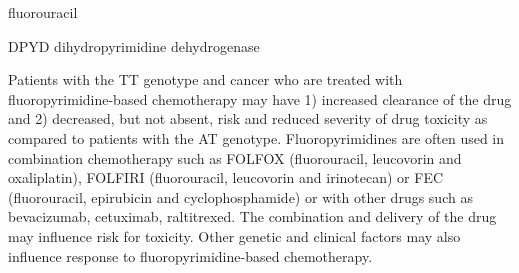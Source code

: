 \documentclass{resume} %
\begin{document}
\begin{rSection}{ fluorouracil }
\begin{rSubsection}{ DPYD }{ dihydropyrimidine dehydrogenase }{}{}
\item[] Patients with the TT genotype and cancer who are treated with fluoropyrimidine-based chemotherapy may have 1) increased clearance of the drug and 2) decreased, but not absent, risk and reduced severity of drug toxicity as compared to patients with the AT genotype. Fluoropyrimidines are often used in combination chemotherapy such as FOLFOX (fluorouracil, leucovorin and oxaliplatin), FOLFIRI (fluorouracil, leucovorin and irinotecan) or FEC (fluorouracil, epirubicin and cyclophosphamide) or with other drugs such as bevacizumab, cetuximab, raltitrexed. The combination and delivery of the drug may influence risk for toxicity. Other genetic and clinical factors may also influence response to fluoropyrimidine-based chemotherapy.

\end{rSubsection}


\end{rSection}
\end{document}

